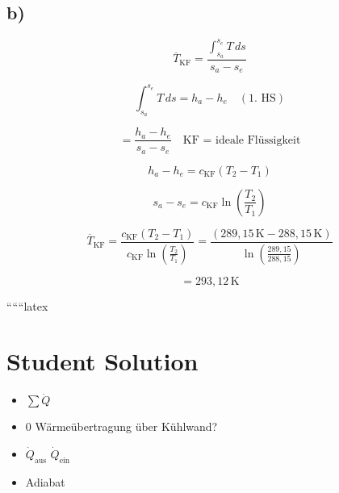 

\subsection*{b)}

\[
\overline{T}_{\text{KF}} = \frac{\int_{s_a}^{s_e} T \, ds}{s_a - s_e}
\]

\[
\int_{s_a}^{s_e} T \, ds = h_a - h_e \quad (\text{1. HS})
\]

\[
= \frac{h_a - h_e}{s_a - s_e} \quad \text{KF = ideale Flüssigkeit}
\]

\[
h_a - h_e = c_{\text{KF}} (T_2 - T_1)
\]

\[
s_a - s_e = c_{\text{KF}} \ln \left( \frac{T_2}{T_1} \right)
\]

\[
\overline{T}_{\text{KF}} = \frac{c_{\text{KF}} (T_2 - T_1)}{c_{\text{KF}} \ln \left( \frac{T_2}{T_1} \right)} = \frac{(289,15 \, \text{K} - 288,15 \, \text{K})}{\ln \left( \frac{289,15}{288,15} \right)}
\]

\[
= 293,12 \, \text{K}
\]

``````latex


\section*{Student Solution}

\begin{itemize}
    \item \(\sum \dot{Q}\)
    \item \(0\) Wärmeübertragung über Kühlwand?
    \item \(\dot{Q}_{\text{aus}}\) \(\dot{Q}_{\text{ein}}\)
    \item Adiabat
\end{itemize}

